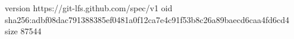 version https://git-lfs.github.com/spec/v1
oid sha256:adbf08dac791388385ef0481a0f12ca7e4c91f53b8c26a89baecd6caa4fd6cd4
size 87544
